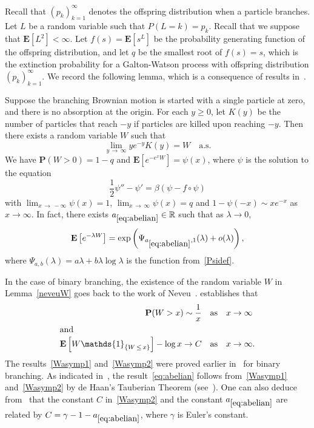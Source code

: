\documentclass[AHL,Unicode,longabstracts,published]{cedram}
\newcommand*\E{\mathbf{E}}
\renewcommand*\P{\mathbf{P}}
\newcommand*\R{\mathbb{R}}
\newcommand{\1} {\mathds{1}}
\renewcommand*\to{\rightarrow}
\begin{document}
Recall that $(p_k)_{k=1}^{\infty}$ denotes the offspring distribution when a particle branches. Let $L$ be a random variable such that $P(L = k) = p_k$. Recall that we suppose that $\E[L^2]<\infty$. Let $f(s) = \E[s^L]$ be the probability generating function of the offspring distribution, and let $q$ be the smallest root of $f(s) = s$, which is the extinction probability for a Galton-Watson process with offspring distribution $(p_k)_{k=1}^{\infty}$. We record the following lemma, which is a consequence of results in~\cite[Chapter~4]{thesis}.

\begin{lemm}\label{neveuW}
Suppose the branching Brownian motion is started with a single particle at zero, and there is no absorption at the origin. For each $y \geq 0$, let $K(y)$ be the number of particles that reach $-y$ if particles are killed upon reaching $-y$. Then there exists a random variable $W$ such that
\[
\lim_{y\,\rightarrow\,\infty} y e^{-y} K(y) = W \quad\text{a.s.}
\]
We have $\P(W > 0) = 1 - q$ and $\E[e^{-e^x W}] = \psi(x)$, where $\psi$ is the solution to the equation
\[
\frac{1}{2} \psi'' - \psi' = \beta\left(\psi - f \circ \psi\right)
\]
with $\lim_{x\,\rightarrow\,-\infty} \psi(x) = 1$, $\lim_{x \,\rightarrow\,\infty} \psi(x) = q$ and $1-\psi(-x)\sim xe^{-x}$ as $x\to\infty$. In fact, there exists $a_{\eqref{eq:abelian}}\in\R$ such that as $\lambda \to 0$,
\begin{equation}\label{eq:abelian}
\E\left[e^{-\lambda W}\right] = \exp\left(\Psi_{a_{\eqref{eq:abelian}},1}(\lambda) + o(\lambda)\right),
\end{equation}
where $\Psi_{a,b}(\lambda) = a\lambda + b\lambda \log \lambda$ is the function from~\eqref{Psidef}.
\end{lemm}

In the case of binary branching, the existence of the random variable $W$ in Lemma~\ref{neveuW} goes back to the work of Neveu~\cite{nev87}. \cite[Proposition~4.1 in Chapter~2]{thesis} establishes that
\begin{align}
\P(W > x) \sim \frac{1}{x}\quad  &\text{as}\quad x \rightarrow \infty
\label{Wasymp1}\\
\intertext{and}
\E\left[W \1_{\left\{W\,\leq\,x\right\}}\right] - \log x \rightarrow C\quad  &\text{as}\quad x \rightarrow \infty.\label{Wasymp2}
\end{align}
The results~\eqref{Wasymp1} and~\eqref{Wasymp2} were proved earlier in~\cite{bbs2} for binary branching. As indicated in~\cite{thesis}, the result~\eqref{eq:abelian} follows from~\eqref{Wasymp1} and~\eqref{Wasymp2} by de Haan's Tauberian Theorem (see~\cite[Theorem~2]{dh76}). One can also deduce from~\cite[Theorem~2]{dh76} that the constant $C$ in~\eqref{Wasymp2} and the constant $a_{\eqref{eq:abelian}}$ are related by $C = \gamma - 1 - a_{\eqref{eq:abelian}}$, where $\gamma$ is Euler's constant.
\end{document}
